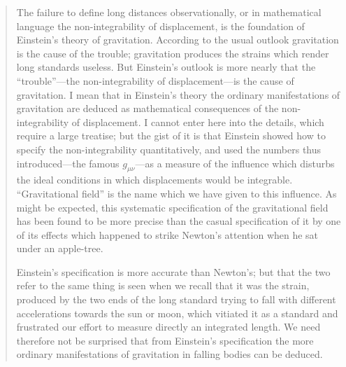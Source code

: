 \begin{quote}
    The failure to define long distances observationally, or in mathematical language the non-integrability of displacement, is the foundation of Einstein's theory of gravitation.  According to the usual outlook gravitation is the cause of the trouble; gravitation produces the strains which render long standards useless.  But Einstein's outlook is more nearly that the ``trouble''---the non-integrability of displacement---is the cause of gravitation.  I mean that in Einstein's theory the ordinary manifestations of gravitation are deduced as mathematical consequences of the non-integrability of displacement.  I cannot enter here into the details, which require a large treatise; but the gist of it is that Einstein showed how to specify the non-integrability quantitatively, and used the numbers thus introduced---the famous $g_{\mu\nu}$---as a measure of the influence which disturbs the ideal conditions in which displacements would be integrable.  ``Gravitational field'' is the name which we have given to this influence.  As might be expected, this systematic specification of the gravitational field has been found to be more precise than the casual specification of it by one of its effects which happened to strike Newton's attention when he sat under an apple-tree.  

    Einstein's specification is more accurate than Newton's; but that the two refer to the same thing is seen when we recall that it was the strain, produced by the two ends of the long standard trying to fall with different accelerations towards the sun or moon, which vitiated it as a standard and frustrated our effort to measure directly an integrated length.  We need therefore not be surprised that from Einstein's specification the more ordinary manifestations of gravitation in falling bodies can be deduced.  


\end{quote}
